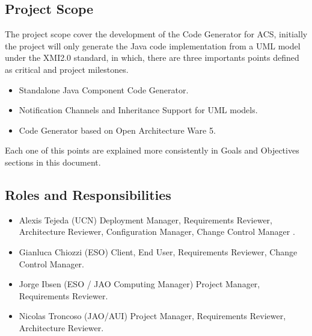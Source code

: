 \subsection{Project Scope}
The project scope cover the development of the Code Generator for ACS,
initially the project will only generate the Java code implementation from a
UML model under the XMI2.0 standard, in which, there are three importants
points defined as critical and project milestones.

\begin{itemize}
	\item Standalone Java Component Code Generator.
	\item Notification Channels and Inheritance Support for UML models.
	\item Code Generator based on Open Architecture Ware 5.
\end{itemize}
Each one of this points are explained more consistently in Goals and Objectives
sections in this document.

\subsection{Roles and Responsibilities}
\begin{itemize}
\item Alexis Tejeda (UCN) Deployment Manager, Requirements Reviewer,
Architecture Reviewer, Configuration Manager, Change Control Manager . 
\item Gianluca Chiozzi (ESO) Client, End User, Requirements Reviewer, Change
Control Manager.
\item Jorge Ibsen (ESO / JAO Computing Manager) Project Manager, Requirements
Reviewer.
\item Nicolas Troncoso (JAO/AUI) Project Manager, Requirements Reviewer,
Architecture Reviewer.
\end{itemize} 

\newpage









